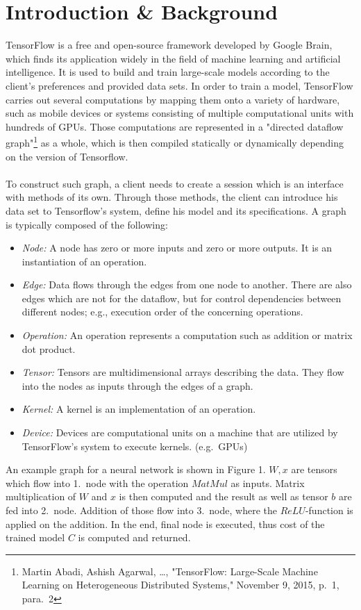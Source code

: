 \documentclass[ieeetran]{article}
\begin{document}
\section{Introduction \& Background} %
\label{sec:introduction}
TensorFlow is a free and open-source framework developed by Google Brain, which finds its application widely in the field of machine learning and artificial intelligence. It is used to build and train large-scale models according to the client's preferences and provided data sets. In order to train a model, TensorFlow carries out several computations by mapping them onto a variety of hardware, such as mobile devices or systems consisting of multiple computational units with hundreds of GPUs. Those computations are represented in a "directed dataflow graph"\footnote{Martin Abadi, Ashish Agarwal, \ldots, "TensorFlow: Large-Scale Machine Learning on Heterogeneous Distributed Systems," November 9, 2015, p.\ 1, para.\ 2} as a whole, which is then compiled statically or dynamically depending on the version of Tensorflow. 
\\ \\To construct such graph, a client needs to create a session which is an interface with methods of its own. Through those methods, the client can introduce his data set to Tensorflow's system, define his model and its specifications. A graph is typically composed of the following:
\begin{itemize}
  \item \textit{Node:} A node has zero or more inputs and zero or more outputs. It is an instantiation of an operation.
\item \textit{Edge:} Data flows through the edges from one node to another. There are also edges which are not for the dataflow, but for control dependencies between different nodes; e.g., execution order of the concerning operations.
\item \textit{Operation:} An operation represents a computation such as addition or matrix dot product.
\item \textit{Tensor:} Tensors are multidimensional arrays describing the data. They flow into the nodes as inputs through the edges of a graph.
\item \textit{Kernel:} A kernel is an implementation of an operation.
\item \textit{Device:} Devices are computational units on a machine that are utilized by TensorFlow's system to execute kernels. (e.g.\ GPUs)
\end{itemize}
An example graph for a neural network is shown in Figure 1. $W, x$ are tensors which flow into 1.\ node with the operation $MatMul$ as inputs. Matrix multiplication of $W$ and $x$ is then computed and the result as well as tensor $b$ are fed into 2.\ node. Addition of those flow into 3.\ node, where the $ReLU$-function is applied on the addition. In the end, final node is executed, thus cost of the trained model $C$ is computed and returned.
\end{document}

